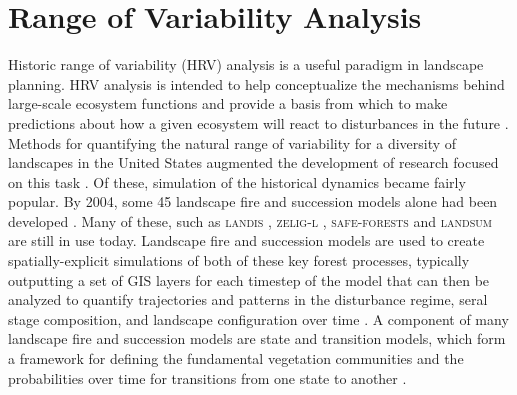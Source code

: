 \section{Range of Variability Analysis}

Historic range of variability (HRV) analysis is a useful paradigm in landscape planning. HRV analysis is intended to help conceptualize the mechanisms behind large-scale ecosystem functions and provide a basis from which to make predictions about how a given ecosystem will react to disturbances in the future \citep{Nonaka2005,Landres1999}. Methods for quantifying the natural range of variability for a diversity of landscapes in the United States augmented the development of research focused on this task \citep{Landres1999}. Of these, simulation of the historical dynamics became fairly popular. By 2004, some 45 landscape fire and succession models alone had been developed \citep{Keane2004}. Many of these, such as \textsc{landis} \citep{He1999}, \textsc{zelig-l} \citep{Miller1999}, \textsc{safe-forests} \cite{Sessions1997} and \textsc{landsum} \citep{Keane2012} are still in use today. Landscape fire and succession models are used to create spatially-explicit simulations of both of these key forest processes, typically outputting a set of GIS layers for each timestep of the model that can then be analyzed to quantify trajectories and patterns in the disturbance regime, seral stage composition, and landscape configuration over time \citep{Keane2004}. A component of many landscape fire and succession models are state and transition models, which form a framework for defining the fundamental vegetation communities and the probabilities over time for transitions from one state to another \citep{Stringham2003,Blankenship2015}.

